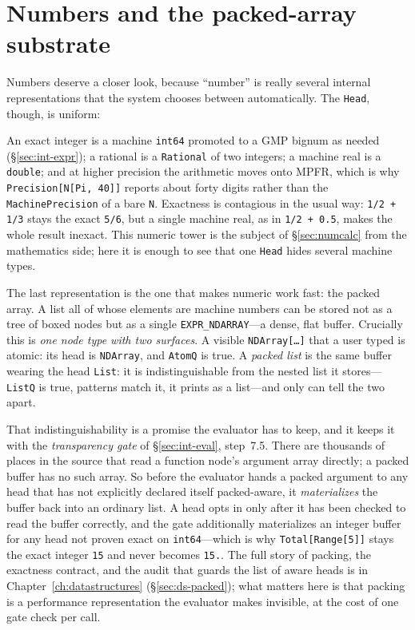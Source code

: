 \section{Numbers and the packed-array substrate}
\label{sec:int-packed}

Numbers deserve a closer look, because ``number'' is really several internal
representations that the system chooses between automatically. The
\texttt{Head}, though, is uniform:


An exact integer is a machine \texttt{int64} promoted to a GMP bignum as needed
(\S\ref{sec:int-expr}); a rational is a \texttt{Rational} of two integers; a machine
real is a \texttt{double}; and at higher precision the arithmetic moves onto MPFR,
which is why \texttt{Precision[N[Pi, 40]]} reports about forty digits rather than the
\texttt{MachinePrecision} of a bare \texttt{N}. Exactness is contagious in the usual
way: \texttt{1/2 + 1/3} stays the exact \texttt{5/6}, but a single machine real, as in
\texttt{1/2 + 0.5}, makes the whole result inexact. This numeric tower is the subject
of \S\ref{sec:numcalc} from the mathematics side; here it is enough to see that one
\texttt{Head} hides several machine types.

The last representation is the one that makes numeric work fast: the packed array. A
list all of whose elements are machine numbers can be stored not as a tree of boxed
nodes but as a single \texttt{EXPR\_NDARRAY}---a dense, flat buffer. Crucially this is
\emph{one node type with two surfaces}. A visible \texttt{NDArray[\dots]} that a user
typed is atomic: its head is \texttt{NDArray}, and \texttt{AtomQ} is true. A
\emph{packed list} is the same buffer wearing the head \texttt{List}: it is
indistinguishable from the nested list it stores---\texttt{ListQ} is true, patterns
match it, it prints as a list---and only  can tell the two apart.


That indistinguishability is a promise the evaluator has to keep, and it keeps it with
the \emph{transparency gate} of \S\ref{sec:int-eval}, step~7.5. There are thousands of
places in the source that read a function node's argument array directly; a packed
buffer has no such array. So before the evaluator hands a packed argument to any head
that has not explicitly declared itself packed-aware, it \emph{materializes} the buffer
back into an ordinary list. A head opts in only after it has been checked to read the
buffer correctly, and the gate additionally materializes an integer buffer for any head
not proven exact on \texttt{int64}---which is why \texttt{Total[Range[5]]} stays the
exact integer \texttt{15} and never becomes \texttt{15.}. The full story of packing,
the exactness contract, and the audit that guards the list of aware heads is in
Chapter~\ref{ch:datastructures} (\S\ref{sec:ds-packed}); what matters here is that
packing is a performance representation the evaluator makes invisible, at the cost of
one gate check per call.

